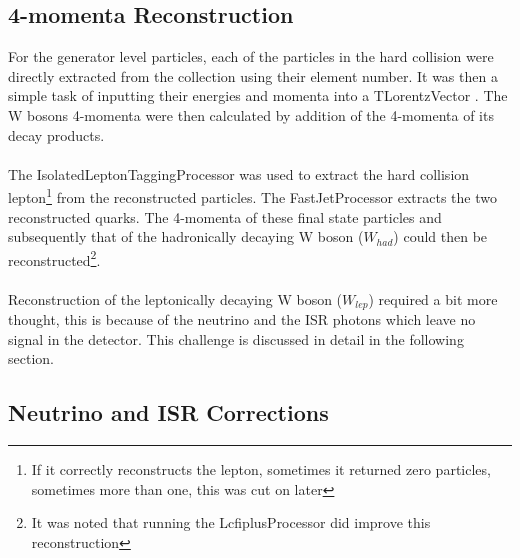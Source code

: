\subsection{4-momenta Reconstruction}
\label{SUBSEC:4momentaReconstruction}
For the generator level particles, each of the particles in the hard collision were directly extracted from the collection using their element number. It was then a simple task of inputting their energies and momenta into a TLorentzVector \cite{TLorentzVector}. The W bosons 4-momenta were then calculated by addition of the 4-momenta of its decay products.
\\\\
The IsolatedLeptonTaggingProcessor \cite{IsolatedLeptonTaggingProcessor} was used to extract the hard collision lepton\footnote{If it correctly reconstructs the lepton, sometimes it returned zero particles, sometimes more than one, this was cut on later} from the reconstructed particles. The FastJetProcessor \cite{FastJet} extracts the two reconstructed quarks. The 4-momenta of these final state particles and subsequently that of the hadronically decaying W boson (${W}_{had}$) could then be reconstructed\footnote{It was noted that running the LcfiplusProcessor \cite{reVertex} did improve this reconstruction}.
\\\\
Reconstruction of the leptonically decaying W boson (${W}_{lep}$) required a bit more thought, this is because of the neutrino and the ISR photons which leave no signal in the detector. This challenge is discussed in detail in the following section.

\subsection{Neutrino and ISR Corrections}
